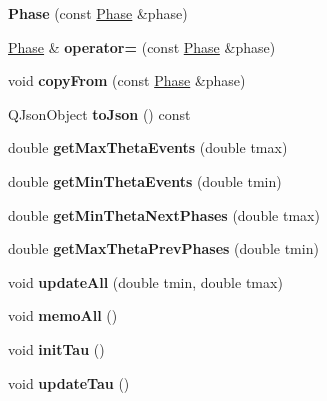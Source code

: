 \begin{DoxyCompactItemize}
\item 
\hypertarget{class_phase_a2c00d601d23fb3895375e02163db1d2a}{{\bfseries Phase} (const \hyperlink{class_phase}{Phase} \&phase)}\label{class_phase_a2c00d601d23fb3895375e02163db1d2a}

\item 
\hypertarget{class_phase_ab68bfa4e8cd25b35b5efc3ae32289055}{\hyperlink{class_phase}{Phase} \& {\bfseries operator=} (const \hyperlink{class_phase}{Phase} \&phase)}\label{class_phase_ab68bfa4e8cd25b35b5efc3ae32289055}

\item 
\hypertarget{class_phase_a2a360b862200a801fbc3098b4e80cafe}{void {\bfseries copy\-From} (const \hyperlink{class_phase}{Phase} \&phase)}\label{class_phase_a2a360b862200a801fbc3098b4e80cafe}

\item 
\hypertarget{class_phase_a09d6e76a1ba26b112039a5f6d0ffd346}{Q\-Json\-Object {\bfseries to\-Json} () const }\label{class_phase_a09d6e76a1ba26b112039a5f6d0ffd346}

\item 
\hypertarget{class_phase_afdf7eeac44c59f4d600314a3edaf8016}{double {\bfseries get\-Max\-Theta\-Events} (double tmax)}\label{class_phase_afdf7eeac44c59f4d600314a3edaf8016}

\item 
\hypertarget{class_phase_a021e4abe1530f7c115a52e2993dc3cec}{double {\bfseries get\-Min\-Theta\-Events} (double tmin)}\label{class_phase_a021e4abe1530f7c115a52e2993dc3cec}

\item 
\hypertarget{class_phase_a63d9e76a9dd2d21f4fb88fcd23a3f946}{double {\bfseries get\-Min\-Theta\-Next\-Phases} (double tmax)}\label{class_phase_a63d9e76a9dd2d21f4fb88fcd23a3f946}

\item 
\hypertarget{class_phase_a009cd29fa4926d2cbffb7dbe5ba73233}{double {\bfseries get\-Max\-Theta\-Prev\-Phases} (double tmin)}\label{class_phase_a009cd29fa4926d2cbffb7dbe5ba73233}

\item 
\hypertarget{class_phase_a96028a76d205bea069022a75bff8e9c8}{void {\bfseries update\-All} (double tmin, double tmax)}\label{class_phase_a96028a76d205bea069022a75bff8e9c8}

\item 
\hypertarget{class_phase_a809f524936eb51825bbf5bf7fb900b5c}{void {\bfseries memo\-All} ()}\label{class_phase_a809f524936eb51825bbf5bf7fb900b5c}

\item 
\hypertarget{class_phase_a3154a81e4affa1714037f5514c34cd81}{void {\bfseries init\-Tau} ()}\label{class_phase_a3154a81e4affa1714037f5514c34cd81}

\item 
\hypertarget{class_phase_ab2536b85a742e2f0aa0f78df2df2281e}{void {\bfseries update\-Tau} ()}\label{class_phase_ab2536b85a742e2f0aa0f78df2df2281e}

\end{DoxyCompactItemize}
